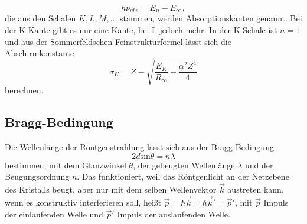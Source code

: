\begin{equation}
  h\nu_{abs}=E_{n}-E_{\infty},
  \label{5}
\end{equation}
die aus den Schalen $K,L,M,...$ stammen, werden Absorptionskanten genannt. Bei der K-Kante gibt es nur eine Kante, bei L jedoch mehr. In der K-Schale ist $n=1$ und aus der Sommerfeldschen Feinstrukturformel lässt sich die Abschirmkonstante 
\begin{equation}
  \sigma_{K}=Z-\sqrt{\frac{E_{K}}{R_{\infty}}-\frac{\alpha^2 Z^4}{4}}
  \label{6}
\end{equation}
berechnen.\\

\subsection{Bragg-Bedingung}
Die Wellenlänge der Röntgenstrahlung lässt sich aus der Bragg-Bedingung
\begin{equation}
  2d\textrm{sin}\theta=n\lambda
  \label{7}
\end{equation}
bestimmen, mit dem Glanzwinkel $\theta$, der gebeugten Wellenlänge $\lambda$ und der Beugungsordnung $n$. Das funktioniert, weil das Röntgenlicht an der Netzebene des Kristalls beugt, aber nur mit dem selben Wellenvektor $\vec k$ austreten kann, wenn es konstruktiv interferieren soll, heißt $\vec p=\hbar\vec k=\hbar\vec k'=\vec p'$, mit $\vec p$ Impuls der einlaufenden Welle und $\vec p'$ Impuls der auslaufenden Welle. 

